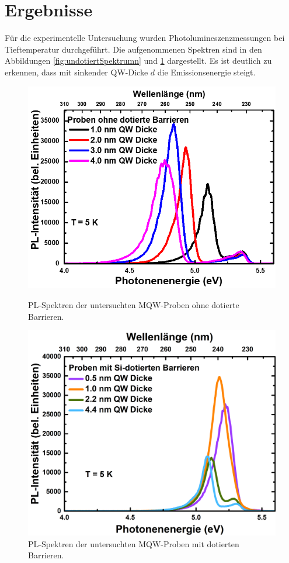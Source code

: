 \section{Ergebnisse}
Für die experimentelle Untersuchung wurden Photolumineszenzmessungen bei Tieftemperatur durchgeführt. Die aufgenommenen Spektren sind in den Abbildungen \ref{fig:undotiertSpektrumn} und \ref{fig:dotiertSpektrumn} dargestellt.
Es ist deutlich zu erkennen, dass mit sinkender QW-Dicke $d$ die Emissionsenergie steigt.
\begin{figure}[H]
  \centering
  \begin{minipage}[t]{0.45\textwidth}
    \centering
    \includegraphics[width=\textwidth]{Bilder/MQWdickenSerie/spektrumUndotiert}
		\caption{PL-Spektren der untersuchten MQW-Proben ohne dotierte Barrieren.}
    \label{fig:undotiertSpektrumn}
  \end{minipage}
	\hfill
  \begin{minipage}[t]{0.45\textwidth}
    \centering
    \includegraphics[width=\linewidth]{Bilder/MQWdickenSerie/spektrumDotiert}
		\caption{PL-Spektren der untersuchten MQW-Proben mit dotierten Barrieren.}
    \label{fig:dotiertSpektrumn}
  \end{minipage}
\end{figure}
